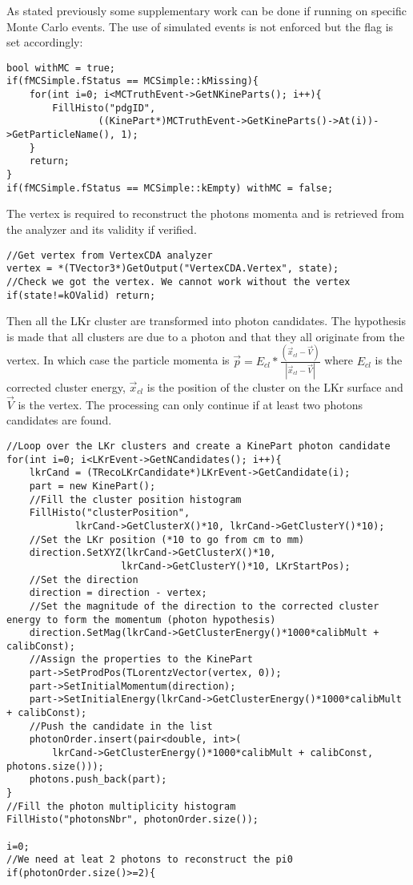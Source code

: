 As stated previously some supplementary work can be done if running on specific Monte Carlo events.
The use of simulated events is not enforced but the  flag is set accordingly:
\begin{lstlisting}
bool withMC = true;
if(fMCSimple.fStatus == MCSimple::kMissing){
	for(int i=0; i<MCTruthEvent->GetNKineParts(); i++){
		FillHisto("pdgID", 
				((KinePart*)MCTruthEvent->GetKineParts()->At(i))->GetParticleName(), 1);
	}
	return;
}
if(fMCSimple.fStatus == MCSimple::kEmpty) withMC = false;
\end{lstlisting}

The vertex is required to reconstruct the photons momenta and is retrieved from the
 analyzer and its validity if verified.
\begin{lstlisting}
//Get vertex from VertexCDA analyzer
vertex = *(TVector3*)GetOutput("VertexCDA.Vertex", state);
//Check we got the vertex. We cannot work without the vertex
if(state!=kOValid) return;
\end{lstlisting}

Then all the LKr cluster are transformed into photon candidates. The hypothesis is made that all
clusters are due to a photon and that they all originate from the vertex. In which case the
particle momenta is 
$\vec{p}=E_{cl}*\frac{(\vec{x}_{cl}-\vec{V})}{\left|\vec{x}_{cl}-\vec{V}\right|}$ where $E_{cl}$ is
the corrected cluster energy, $\vec{x}_{cl}$ is the position of the cluster on the LKr surface and
$\vec{V}$ is the vertex. The processing can only continue if at least two photons candidates are
found.
\begin{lstlisting}
//Loop over the LKr clusters and create a KinePart photon candidate
for(int i=0; i<LKrEvent->GetNCandidates(); i++){
	lkrCand = (TRecoLKrCandidate*)LKrEvent->GetCandidate(i);
	part = new KinePart();
	//Fill the cluster position histogram
	FillHisto("clusterPosition", 
			lkrCand->GetClusterX()*10, lkrCand->GetClusterY()*10);
	//Set the LKr position (*10 to go from cm to mm)
	direction.SetXYZ(lkrCand->GetClusterX()*10, 
					lkrCand->GetClusterY()*10, LKrStartPos);
	//Set the direction
	direction = direction - vertex;
	//Set the magnitude of the direction to the corrected cluster energy to form the momentum (photon hypothesis)
	direction.SetMag(lkrCand->GetClusterEnergy()*1000*calibMult + calibConst);
	//Assign the properties to the KinePart
	part->SetProdPos(TLorentzVector(vertex, 0));
	part->SetInitialMomentum(direction);
	part->SetInitialEnergy(lkrCand->GetClusterEnergy()*1000*calibMult + calibConst);
	//Push the candidate in the list
	photonOrder.insert(pair<double, int>(
		lkrCand->GetClusterEnergy()*1000*calibMult + calibConst, photons.size()));
	photons.push_back(part);
}
//Fill the photon multiplicity histogram
FillHisto("photonsNbr", photonOrder.size());

i=0;
//We need at leat 2 photons to reconstruct the pi0
if(photonOrder.size()>=2){
\end{lstlisting}

